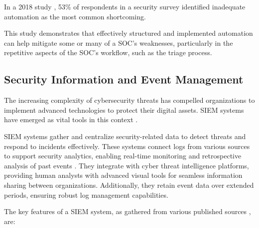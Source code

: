 In a 2018 study \parencite{Crowley2018}, 53\% of respondents in a security survey identified inadequate automation as the most common shortcoming.

This study demonstrates that effectively structured and implemented automation can help mitigate some or many of a \gls{SOC}'s weaknesses, particularly in the repetitive aspects of the \gls{SOC}'s workflow, such as the triage process.

\subsection{Security Information and Event Management}

The increasing complexity of cybersecurity threats has compelled organizations to implement advanced technologies to protect their digital assets. 
\gls{SIEM} systems have emerged as vital tools in this context \parencite{Shaw2022}.

\gls{SIEM} systems gather and centralize security-related data to detect threats and respond to incidents effectively. 
These systems connect logs from various sources to support security analytics, enabling real-time monitoring and retrospective analysis of past events \parencite{Shaw2022}.
They integrate with cyber threat intelligence platforms, providing human analysts with advanced visual tools for seamless information sharing between organizations. 
Additionally, they retain event data over extended periods, ensuring robust log management capabilities.

The key features of a \gls{SIEM} system, as gathered from various published sources \parencite{Harper2010, Sheeraz2023, Ali2024}, are:

